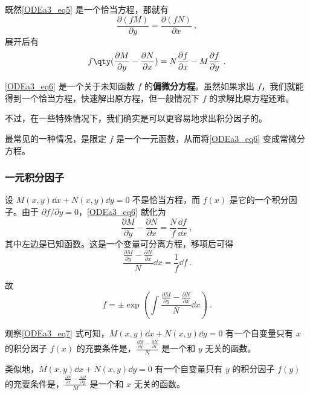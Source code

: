 既然\autoref{ODEa3_eq5} 是一个恰当方程，那就有
\begin{equation}
\frac{\partial (fM)}{\partial y}=\frac{\partial (fN)}{\partial x}~,
\end{equation}
展开后有
\begin{equation}\label{ODEa3_eq6}
f\qty(\frac{\partial M}{\partial y}-\frac{\partial N}{\partial x})=N\frac{\partial f}{\partial x}-M\frac{\partial f}{\partial y}~.
\end{equation}

\autoref{ODEa3_eq6} 是一个关于未知函数 $f$ 的\textbf{偏微分方程}。虽然如果求出 $f$，我们就能得到一个恰当方程，快速解出原方程，但一般情况下 $f$ 的求解比原方程还难。

不过，在一些特殊情况下，我们确实是可以更容易地求出积分因子的。

最常见的一种情况，是限定 $f$ 是一个一元函数，从而将\autoref{ODEa3_eq6} 变成常微分方程。

\subsubsection{一元积分因子}

设 $M(x, y)\dd x+N(x, y)\dd y=0$ 不是恰当方程，而 $f(x)$ 是它的一个积分因子。由于 $\partial f/\partial y=0$，\autoref{ODEa3_eq6} 就化为
\begin{equation}
\frac{\partial M}{\partial y}-\frac{\partial N}{\partial x}=\frac{N}{f}\frac{\dd f}{\dd x}~,
\end{equation}
其中左边是已知函数。这是一个变量可分离方程，移项后可得
\begin{equation}
\frac{\frac{\partial M}{\partial y}-\frac{\partial N}{\partial x}}{N}\dd x=\frac{1}{f}\dd f~.
\end{equation}

故
\begin{equation}\label{ODEa3_eq7}
f=\pm \exp(\int \frac{\frac{\partial M}{\partial y}-\frac{\partial N}{\partial x}}{N}\dd x)~.
\end{equation}

观察\autoref{ODEa3_eq7} 式可知，$M(x, y)\dd x+N(x, y)\dd y=0$ 有一个自变量只有 $x$ 的积分因子 $f(x)$ 的充要条件是，$\frac{\frac{\partial M}{\partial y}-\frac{\partial N}{\partial x}}{N}$ 是一个和 $y$ 无关的函数。

类似地，$M(x, y)\dd x+N(x, y)\dd y=0$ 有一个自变量只有 $y$ 的积分因子 $f(y)$ 的充要条件是，$\frac{\frac{\partial N}{\partial x}-\frac{\partial M}{\partial y}}{M}$ 是一个和 $x$ 无关的函数。

